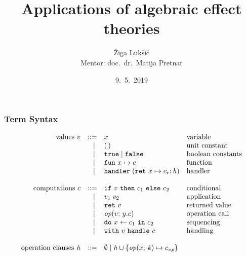 \documentclass[usenames,dvipsnames]{beamer}
\title[Applications of algebraic effect theories]{\LARGE Applications of algebraic effect theories}
\author[Žiga Lukšič]{Žiga Lukšič \\ Mentor: doc.\ dr.\ Matija Pretnar}
\date{9.\ 5.\ 2019}
\begin{document}

\begin{frame}
  \frametitle{Term Syntax}
  
\[
	\begin{array}{rrll}
		\text{values}~v
		 & ::=   & x                                                                              & \text{variable}          \\
		 & \vsep & \unit                                                                          & \text{unit constant}     \\
		 & \vsep & \true \vsep \false                                                             & \text{boolean constants} \\
		 & \vsep & \fun{x}{c}                                                                     & \text{function}          \\
		 & \vsep & \handler{\hcases}                                                              & \text{handler}           \\
		 \\
		 \text{computations}~c
		 & ::=   & \ifclause{v}{c_1}{c_2}                                                         & \text{conditional}       \\
		 & \vsep & \apply{v_1}{v_2}                                                               & \text{application}       \\
		 & \vsep & \return{v}                                                                     & \text{returned value}    \\
		 & \vsep & \operation{v}{y.c}                                                             & \text{operation call}    \\
		 & \vsep & \dobind{x}{c_1}{c_2}                                                           & \text{sequencing}        \\
		 & \vsep & \withhandle{v}{c}                                                              & \text{handling}					\\
		 \\
		 \text{operation clauses}~\hcases
		  & ::=   & \emptyhcases \vsep \hcases \union \set{\operation{x}{\contin} \mapsto c_{\op}}                            \\
		\end{array}
		\]
\end{frame}
\end{document}
